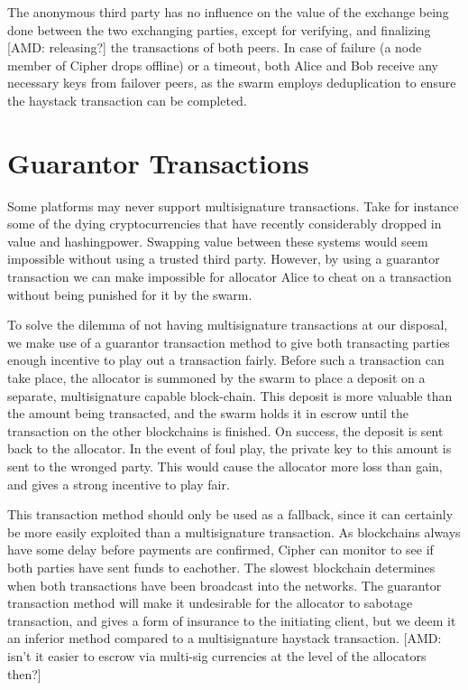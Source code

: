 \documentclass[a4paper]{article}
\begin{document}
The anonymous third party has no influence on the value of the exchange being done between the two exchanging parties, except for verifying, and finalizing [AMD: releasing?] the transactions of both peers. In case of failure (a node member of Cipher drops offline) or a timeout, both Alice and Bob receive any necessary keys from failover peers, as the swarm employs deduplication to ensure the haystack transaction can be completed.


\section{Guarantor Transactions}

Some platforms may never support multisignature transactions. Take for instance some of the dying cryptocurrencies that have recently considerably dropped in value and hashingpower. Swapping value between these systems would seem impossible without using a trusted third party. However, by using a guarantor transaction we can make impossible for allocator Alice to cheat on a transaction without being punished for it by the swarm.

To solve the dilemma of not having multisignature transactions at our disposal, we make use of a guarantor transaction method to give both transacting parties enough incentive to play out a transaction fairly. Before such a transaction can take place, the allocator is summoned by the swarm to place a deposit on a separate, multisignature capable block-chain. This deposit is more valuable than the amount being transacted, and the swarm holds it in escrow until the transaction on the other blockchains is finished. On success, the deposit is sent back to the allocator. In the event of foul play, the private key to this amount is sent to the wronged party. This would cause the allocator more loss than gain, and gives a strong incentive to play fair.

This transaction method should only be used as a fallback, since it can certainly be more easily exploited than a multisignature transaction. As blockchains always have some delay before payments are confirmed, Cipher can monitor to see if both parties have sent funds to eachother. The slowest blockchain determines when both transactions have been broadcast into the networks. The guarantor transaction method will make it undesirable for the allocator to sabotage transaction, and gives a form of insurance to the initiating client, but we deem it an inferior method compared to a multisignature haystack transaction. [AMD: isn't it easier to escrow via multi-sig currencies at the level of the allocators then?]
\end{document}

